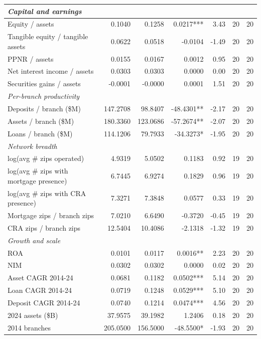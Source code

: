 \begin{tabular}{lrrrrrr}
\midrule
\multicolumn{7}{l}{\emph{Capital and earnings}} \\
\midrule
Equity / assets & 0.1040 & 0.1258 & 0.0217*** & 3.43 & 20 & 20 \\
Tangible equity / tangible assets & 0.0622 & 0.0518 & -0.0104 & -1.49 & 20 & 20 \\
PPNR / assets & 0.0155 & 0.0167 & 0.0012 & 0.95 & 20 & 20 \\
Net interest income / assets & 0.0303 & 0.0303 & 0.0000 & 0.00 & 20 & 20 \\
Securities gains / assets & -0.0001 & -0.0000 & 0.0001 & 1.51 & 20 & 20 \\
\midrule
\multicolumn{7}{l}{\emph{Per-branch productivity}} \\
\midrule
Deposits / branch (\$M) & 147.2708 & 98.8407 & -48.4301** & -2.17 & 20 & 20 \\
Assets / branch (\$M) & 180.3360 & 123.0686 & -57.2674** & -2.07 & 20 & 20 \\
Loans / branch (\$M) & 114.1206 & 79.7933 & -34.3273* & -1.95 & 20 & 20 \\
\midrule
\multicolumn{7}{l}{\emph{Network breadth}} \\
\midrule
log(avg \# zips operated) & 4.9319 & 5.0502 & 0.1183 & 0.92 & 19 & 20 \\
log(avg \# zips with mortgage presence) & 6.7445 & 6.9274 & 0.1829 & 0.96 & 19 & 20 \\
log(avg \# zips with CRA presence) & 7.3271 & 7.3848 & 0.0577 & 0.33 & 19 & 20 \\
Mortgage zips / branch zips & 7.0210 & 6.6490 & -0.3720 & -0.45 & 19 & 20 \\
CRA zips / branch zips & 12.5404 & 10.4086 & -2.1318 & -1.32 & 19 & 20 \\
\midrule
\multicolumn{7}{l}{\emph{Growth and scale}} \\
\midrule
ROA & 0.0101 & 0.0117 & 0.0016** & 2.23 & 20 & 20 \\
NIM & 0.0302 & 0.0302 & 0.0000 & 0.02 & 20 & 20 \\
Asset CAGR 2014-24 & 0.0681 & 0.1182 & 0.0502*** & 5.14 & 20 & 20 \\
Loan CAGR 2014-24 & 0.0719 & 0.1248 & 0.0529*** & 5.10 & 20 & 20 \\
Deposit CAGR 2014-24 & 0.0740 & 0.1214 & 0.0474*** & 4.56 & 20 & 20 \\
2024 assets (\$B) & 37.9575 & 39.1982 & 1.2406 & 0.18 & 20 & 20 \\
2014 branches & 205.0500 & 156.5000 & -48.5500* & -1.93 & 20 & 20 \\

\end{tabular}
